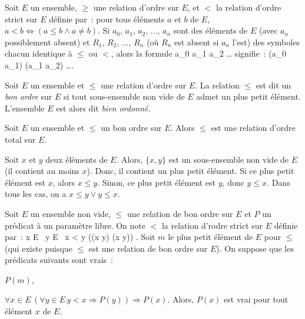 \blank[medium]

\noindent{} Soit $E$ un ensemble, $\geq$ une relation d'ordre sur $E$, et $<$ la relation d'ordre strict sur $E$ définie par : pour tous éléments $a$ et $b$ de $E$, $a < b \Leftrightarrow ( a \leq b \wedge a \neq b )$. 
    Si $a_0$, $a_1$, $a_2$, ..., $a_n$ sont des éléments de $E$ (avec $a_n$ possiblement absent) et $R_1$, $R_2$, ..., $R_n$ (où $R_n$ est absent si $a_n$ l'est) des symboles chacun identique à $\leq$ ou $<$, alors la formule
    \startformula
        a_0  a_1  a_2 \dots
    \stopformula
    signifie :
    \startformula
        (a_0  a_1) \wedge (a_1  a_2) \dots .
    \stopformula

\blank[medium]

\noindent{} Soit $E$ un ensemble et $\leq$ une relation d'ordre sur $E$. 
    La relation $\leq$ est dit un \emph{bon ordre} sur $E$ si tout sous-ensemble non vide de $E$ admet un plus petit élément.
    L'ensemble $E$ est alors dit \emph{bien ordonné}.

\blank[medium]

\noindent{} Soit $E$ un ensemble et $\leq$ un bon ordre sur $E$. 
    Alors $\leq$ est une relation d'ordre total sur $E$.

\blank[medium]

\noindent{}
    Soit $x$ et $y$ deux éléments de $E$. 
    Alors, $\lbrace x, y \rbrace$ est un sous-ensemble non vide de $E$ (il contient au moins $x$).
    Donc, il contient un plus petit élément. 
    Si ce plus petit élément est $x$, alors $x \leq y$.
    Sinon, ce plus petit élément est $y$, donc $y \leq x$.
    Dans tous les cas, on a $x \leq y \vee y \leq x$.

    \done

\stopsubsection

\startsubsection[title=Induction transfinie]

\noindent{}
    Soit $E$ un ensemble non vide, $\leq$ une relation de bon ordre sur $E$ et $P$ un prédicat à un paramètre libre.
    On note $<$ la relation d'rodre strict sur $E$ définie par : 
    \startformula
        \forall x \in E \, \forall y \in E \, x < y \Leftrightarrow ((x \leq y) \wedge (x \neq y)) .
    \stopformula
    Soit $m$ le plus petit élément de $E$ pour $\leq$ (qui existe puisque $\leq$ est une relation de bon ordre sur $E$).
    On suppose que les prédicats suivants sont vrais :
    \startitemize[nowhite]
        \item $P(m)$,
        \item $\forall x \in E \, (\forall y \in E \, y < x \Rightarrow P(y)) \Rightarrow P(x)$.
    \stopitemize
    Alors, $P(x)$ est vrai pour tout élément $x$ de $E$.

